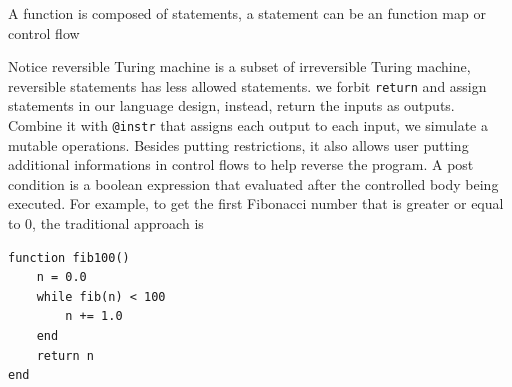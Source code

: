 \documentclass[aps,twocolumn,longbibliography,english,superscriptaddress,prr]{revtex4-1}
\newcommand{\<}{\langle}
\renewcommand{\>}{\rangle}
\newcommand{\ra}[1]{\renewcommand{\arraystretch}{#1}}
\begin{document}
A function is composed of statements, a statement can be an function map or control flow
\begin{table}[h!]\centering
\begin{minipage}{\columnwidth}
\ra{1.3}
    \caption{A collection of reversible statements.}\label{tbl:revstatements}
\end{minipage}
\end{table}
Notice reversible Turing machine is a subset of irreversible Turing machine,
reversible statements has less allowed statements.
we forbit \texttt{return} and assign statements in our language design, instead, return the inputs as outputs.
Combine it with \texttt{@instr} that assigns each output to each input, we simulate a mutable operations.
Besides putting restrictions, it also allows user putting additional informations in control flows to help reverse the program.
A post condition is a boolean expression that evaluated after the controlled body being executed.
For example, to get the first Fibonacci number that is greater or equal to 0, the traditional approach is
\begin{minipage}{.44\textwidth}
\begin{lstlisting}
function fib100()
    n = 0.0
    while fib(n) < 100
        n += 1.0
    end
    return n
end
\end{lstlisting}
\end{minipage}
\end{document}
